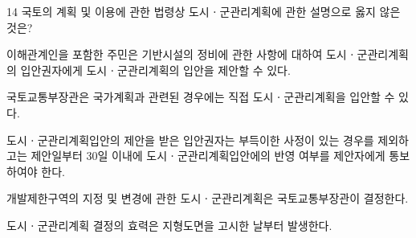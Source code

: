 \begin{question}{14}
국토의 계획 및 이용에 관한 법령상 도시ㆍ군관리계획에 관한 설명으로 옳지 않은 것은?
\begin{choices}
  \item 이해관계인을 포함한 주민은 기반시설의 정비에 관한 사항에 대하여 도시ㆍ군관리계획의 입안권자에게 도시ㆍ군관리계획의 입안을 제안할 수 있다.
  \item 국토교통부장관은 국가계획과 관련된 경우에는 직접 도시ㆍ군관리계획을 입안할 수 있다.
  \item 도시ㆍ군관리계획입안의 제안을 받은 입안권자는 부득이한 사정이 있는 경우를 제외하고는 제안일부터 30일 이내에 도시ㆍ군관리계획입안에의 반영 여부를 제안자에게 통보하여야 한다.
  \item 개발제한구역의 지정 및 변경에 관한 도시ㆍ군관리계획은 국토교통부장관이 결정한다.
  \item 도시ㆍ군관리계획 결정의 효력은 지형도면을 고시한 날부터 발생한다.
\end{choices}
\end{question}
